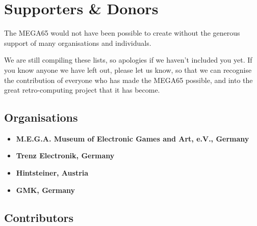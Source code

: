 \chapter{Supporters \& Donors}

The MEGA65 would not have been possible to create without the generous support
of many organisations and individuals.

We are still compiling these lists, so apologies if we haven't included you yet.  If you
know anyone we have left out, please let us know, so that we can recognise the contribution
of everyone who has made the MEGA65 possible, and into the great retro-computing project
that it has become.

\section{Organisations}

\begin{itemize}
\item {\bf M.E.G.A. Museum of Electronic Games and Art, e.V., Germany} 
\item {\bf Trenz Electronik, Germany} 
\item {\bf Hintsteiner, Austria} 
\item {\bf GMK, Germany} 
\end{itemize}

\section{Contributors}

